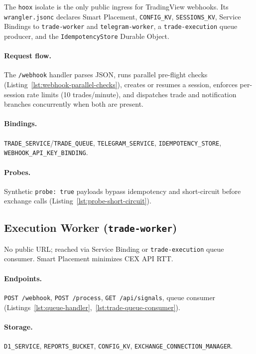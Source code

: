 The \texttt{hoox} isolate is the only public ingress for TradingView webhooks. Its \texttt{wrangler.jsonc} declares Smart Placement, \texttt{CONFIG\_KV}, \texttt{SESSIONS\_KV}, Service Bindings to \texttt{trade-worker} and \texttt{telegram-worker}, a \texttt{trade-execution} queue producer, and the \texttt{IdempotencyStore} Durable Object.

\paragraph{Request flow.} The \texttt{/webhook} handler parses JSON, runs parallel pre-flight checks (Listing~\ref{lst:webhook-parallel-checks}), creates or resumes a session, enforces per-session rate limits (10 trades/minute), and dispatches trade and notification branches concurrently when both are present.

\paragraph{Bindings.} \texttt{TRADE\_SERVICE}/\texttt{TRADE\_QUEUE}, \texttt{TELEGRAM\_SERVICE}, \texttt{IDEMPOTENCY\_STORE}, \texttt{WEBHOOK\_API\_KEY\_BINDING}.

\paragraph{Probes.} Synthetic \texttt{probe: true} payloads bypass idempotency and short-circuit before exchange calls (Listing~\ref{lst:probe-short-circuit}).

\subsection{Execution Worker (\texttt{trade-worker})}

No public URL; reached via Service Binding or \texttt{trade-execution} queue consumer. Smart Placement minimizes CEX API RTT.

\paragraph{Endpoints.} \texttt{POST /webhook}, \texttt{POST /process}, \texttt{GET /api/signals}, queue consumer (Listings~\ref{lst:queue-handler},~\ref{lst:trade-queue-consumer}).

\paragraph{Storage.} \texttt{D1\_SERVICE}, \texttt{REPORTS\_BUCKET}, \texttt{CONFIG\_KV}, \texttt{EXCHANGE\_CONNECTION\_MANAGER}.


